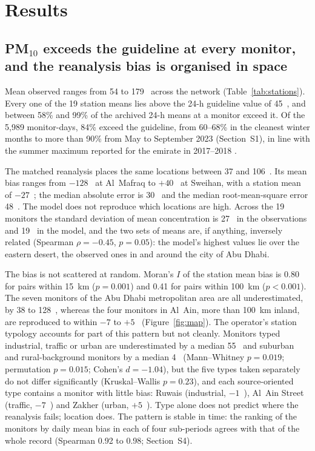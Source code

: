 \section{Results}

\subsection{PM$_{10}$ exceeds the guideline at every monitor, and the reanalysis bias is organised
in space}
\label{sec:res-bias}

Mean observed \pmten{} ranges from 54 to 179~\ugm{} across the network
(Table~\ref{tab:stations}). Every one of the 19 station means lies above the 24-h guideline value
of 45~\ugm{}, and between 58\% and 99\% of the archived 24-h means at a monitor exceed it. Of the
5,989 monitor-days, 84\% exceed the guideline, from 60--68\% in the cleanest winter months to
more than 90\% from May to September 2023 (Section~S1), in line with the summer maximum reported
for the emirate in 2017--2018 \citep{abuelgasim2020}.

The matched reanalysis places the same locations between 37 and 106~\ugm{}. Its mean bias ranges
from $-128$~\ugm{} at Al~Mafraq to $+40$~\ugm{} at Sweihan, with a station mean of $-27$~\ugm{};
the median absolute error is 30~\ugm{} and the median root-mean-square error 48~\ugm{}. The model
does not reproduce which locations are high. Across the 19 monitors the standard deviation of
mean concentration is 27~\ugm{} in the observations and 19~\ugm{} in the model, and the two sets
of means are, if anything, inversely related (Spearman $\rho=-0.45$, $p=0.05$): the model's
highest values lie over the eastern desert, the observed ones in and around the city of Abu Dhabi.

The bias is not scattered at random. Moran's $I$ of the station mean bias is 0.80 for pairs
within 15~km ($p=0.001$) and 0.41 for pairs within 100~km ($p<0.001$). The seven monitors of the
Abu Dhabi metropolitan area are all underestimated, by 38 to 128~\ugm{}, whereas the four
monitors in Al~Ain, more than 100~km inland, are reproduced to within $-7$ to $+5$~\ugm{}
(Figure~\ref{fig:map}). The operator's station typology accounts for part of this pattern but not
cleanly. Monitors typed industrial, traffic or urban are underestimated by a median 55~\ugm{} and
suburban and rural-background monitors by a median 4~\ugm{} (Mann--Whitney $p=0.019$; permutation
$p=0.015$; Cohen's $d=-1.04$), but the five types taken separately do not differ significantly
(Kruskal--Wallis $p=0.23$), and each source-oriented type contains a monitor with little bias:
Ruwais (industrial, $-1$~\ugm{}), Al~Ain Street (traffic, $-7$~\ugm{}) and Zakher (urban,
$+5$~\ugm{}). Type alone does not predict where the reanalysis fails; location does. The pattern
is stable in time: the ranking of the monitors by daily mean bias in each of four sub-periods
agrees with that of the whole record (Spearman 0.92 to 0.98; Section~S4).

